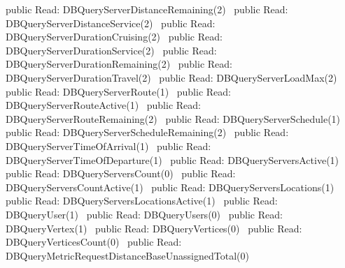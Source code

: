 public \LA{}Read: DBQueryServerDistanceRemaining(2)~{\nwtagstyle{}}\RA{}
public \LA{}Read: DBQueryServerDistanceService(2)~{\nwtagstyle{}}\RA{}
public \LA{}Read: DBQueryServerDurationCruising(2)~{\nwtagstyle{}}\RA{}
public \LA{}Read: DBQueryServerDurationService(2)~{\nwtagstyle{}}\RA{}
public \LA{}Read: DBQueryServerDurationRemaining(2)~{\nwtagstyle{}}\RA{}
public \LA{}Read: DBQueryServerDurationTravel(2)~{\nwtagstyle{}}\RA{}
public \LA{}Read: DBQueryServerLoadMax(2)~{\nwtagstyle{}}\RA{}
public \LA{}Read: DBQueryServerRoute(1)~{\nwtagstyle{}}\RA{}
public \LA{}Read: DBQueryServerRouteActive(1)~{\nwtagstyle{}}\RA{}
public \LA{}Read: DBQueryServerRouteRemaining(2)~{\nwtagstyle{}}\RA{}
public \LA{}Read: DBQueryServerSchedule(1)~{\nwtagstyle{}}\RA{}
public \LA{}Read: DBQueryServerScheduleRemaining(2)~{\nwtagstyle{}}\RA{}
public \LA{}Read: DBQueryServerTimeOfArrival(1)~{\nwtagstyle{}}\RA{}
public \LA{}Read: DBQueryServerTimeOfDeparture(1)~{\nwtagstyle{}}\RA{}
public \LA{}Read: DBQueryServersActive(1)~{\nwtagstyle{}}\RA{}
public \LA{}Read: DBQueryServersCount(0)~{\nwtagstyle{}}\RA{}
public \LA{}Read: DBQueryServersCountActive(1)~{\nwtagstyle{}}\RA{}
public \LA{}Read: DBQueryServersLocations(1)~{\nwtagstyle{}}\RA{}
public \LA{}Read: DBQueryServersLocationsActive(1)~{\nwtagstyle{}}\RA{}
public \LA{}Read: DBQueryUser(1)~{\nwtagstyle{}}\RA{}
public \LA{}Read: DBQueryUsers(0)~{\nwtagstyle{}}\RA{}
public \LA{}Read: DBQueryVertex(1)~{\nwtagstyle{}}\RA{}
public \LA{}Read: DBQueryVertices(0)~{\nwtagstyle{}}\RA{}
public \LA{}Read: DBQueryVerticesCount(0)~{\nwtagstyle{}}\RA{}
\nwendcode{}\nwdocspar
{}
\nwenddocs{}\plusendmoddef
public \LA{}Read: DBQueryMetricRequestDistanceBaseUnassignedTotal(0)~{\nwtagstyle{}}\RA{}
